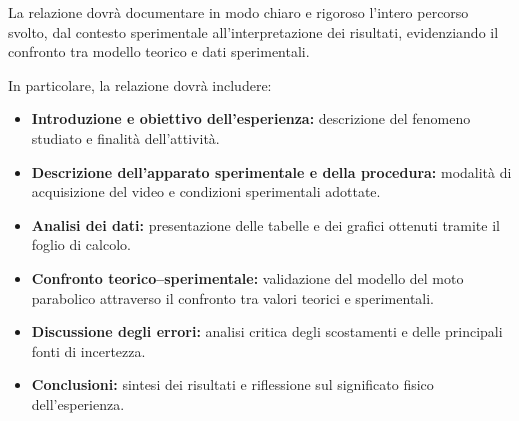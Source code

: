 \documentclass[11pt,a4paper]{article}
\begin{document}
La relazione dovrà documentare in modo chiaro e rigoroso l’intero percorso svolto, dal contesto sperimentale all’interpretazione dei risultati, evidenziando il confronto tra modello teorico e dati sperimentali.

In particolare, la relazione dovrà includere:
\begin{itemize}
    \item \textbf{Introduzione e obiettivo dell’esperienza:} descrizione del fenomeno studiato e finalità dell’attività.
    \item \textbf{Descrizione dell’apparato sperimentale e della procedura:} modalità di acquisizione del video e condizioni sperimentali adottate.
    \item \textbf{Analisi dei dati:} presentazione delle tabelle e dei grafici ottenuti tramite il foglio di calcolo.
    \item \textbf{Confronto teorico--sperimentale:} validazione del modello del moto parabolico attraverso il confronto tra valori teorici e sperimentali.
    \item \textbf{Discussione degli errori:} analisi critica degli scostamenti e delle principali fonti di incertezza.
    \item \textbf{Conclusioni:} sintesi dei risultati e riflessione sul significato fisico dell’esperienza.
\end{itemize}
\end{document}
